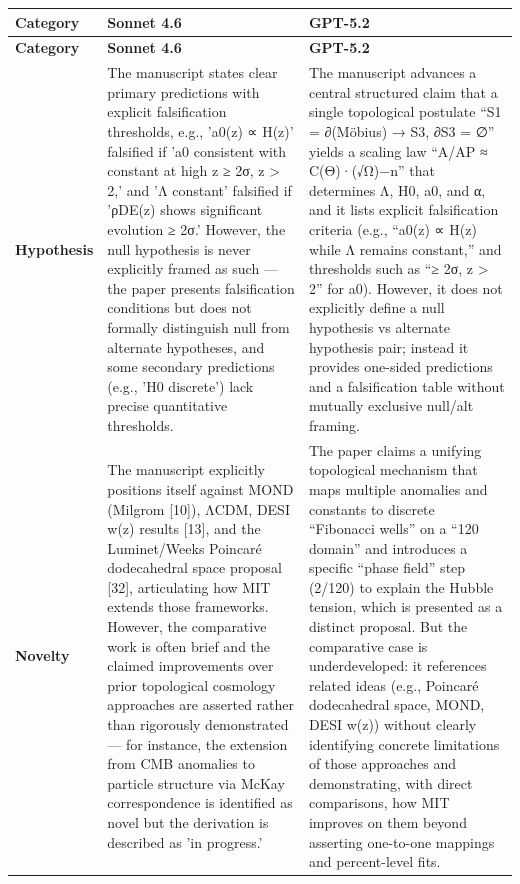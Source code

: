 \documentclass[11pt]{article}
\begin{document}
\begin{longtable}{@{} p{2.2cm} p{6.3cm} p{6.3cm} @{}}
\toprule
\textbf{Category} & \textbf{Sonnet 4.6} & \textbf{GPT-5.2} \\
\midrule
\endfirsthead
\toprule
\textbf{Category} & \textbf{Sonnet 4.6} & \textbf{GPT-5.2} \\
\midrule
\endhead
\bottomrule
\endlastfoot

\rowcolor{rowgray}
\textbf{Hypothesis} &
The manuscript states clear primary predictions with explicit falsification thresholds, e.g., 'a0(z) ∝ H(z)' falsified if 'a0 consistent with constant at high z ≥ 2σ, z > 2,' and 'Λ constant' falsified if 'ρDE(z) shows significant evolution ≥ 2σ.' However, the null hypothesis is never explicitly framed as such — the paper presents falsification conditions but does not formally distinguish null from alternate hypotheses, and some secondary predictions (e.g., 'H0 discrete') lack precise quantitative thresholds. &
The manuscript advances a central structured claim that a single topological postulate “S1 = ∂(Möbius) → S3, ∂S3 = ∅” yields a scaling law “A/AP ≈ C(Θ)·(√Ω)−n” that determines Λ, H0, a0, and α, and it lists explicit falsification criteria (e.g., “a0(z) ∝ H(z) while Λ remains constant,” and thresholds such as “≥ 2σ, z > 2” for a0). However, it does not explicitly define a null hypothesis vs alternate hypothesis pair; instead it provides one-sided predictions and a falsification table without mutually exclusive null/alt framing. \\[6pt]

\textbf{Novelty} &
The manuscript explicitly positions itself against MOND (Milgrom [10]), ΛCDM, DESI w(z) results [13], and the Luminet/Weeks Poincaré dodecahedral space proposal [32], articulating how MIT extends those frameworks. However, the comparative work is often brief and the claimed improvements over prior topological cosmology approaches are asserted rather than rigorously demonstrated — for instance, the extension from CMB anomalies to particle structure via McKay correspondence is identified as novel but the derivation is described as 'in progress.' &
The paper claims a unifying topological mechanism that maps multiple anomalies and constants to discrete “Fibonacci wells” on a “120 domain” and introduces a specific “phase field” step (2/120) to explain the Hubble tension, which is presented as a distinct proposal. But the comparative case is underdeveloped: it references related ideas (e.g., Poincaré dodecahedral space, MOND, DESI w(z)) without clearly identifying concrete limitations of those approaches and demonstrating, with direct comparisons, how MIT improves on them beyond asserting one-to-one mappings and percent-level fits. \\[6pt]


\end{longtable}
\end{document}

